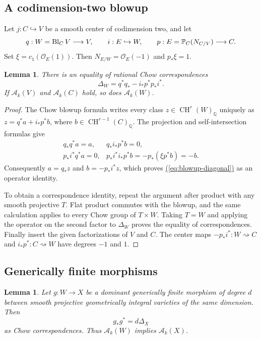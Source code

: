 \documentclass[11pt,a4paper]{article}
\newtheorem{lemma}[theorem]{Lemma}
\theoremstyle{definition}
\theoremstyle{remark}\newtheorem{remark}[theorem]{Remark}
\numberwithin{equation}{section}
\newcommand{\Q}{\mathbb Q}\newcommand{\R}{\mathbb R}\newcommand{\C}{\mathbb C}
\newcommand{\PP}{\mathbb P}\newcommand{\LL}{\mathbb L}
\newcommand{\CH}{\operatorname{CH}}\newcommand{\an}{\mathrm{an}}
\renewcommand{\eqref}[1]{\hyperref[#1]{\textcolor{equationlink}{(\ref*{#1})}}}
\begin{document}
\subsection{A codimension-two blowup}

Let $j:C\hookrightarrow V$ be a smooth center of codimension two,
and let
\[
 q:W=\Bl_CV\longrightarrow V,\qquad i:E\hookrightarrow W,
 \qquad p:E=\PP_C(N_{C/V})\longrightarrow C.
\]
Set $\xi=c_1(\mathcal O_E(1))$. Then $N_{E/W}=\mathcal O_E(-1)$
and $p_*\xi=1$.

\begin{lemma}\label{lem:blowup}
There is an equality of rational Chow correspondences
\begin{equation}\label{eq:blowup-diagonal}
        \Delta_W=q^*q_*-i_*p^*p_*i^*.
\end{equation}
If $\mathcal A_k(V)$ and $\mathcal A_k(C)$ hold, so does
$\mathcal A_k(W)$.
\end{lemma}

\begin{proof}
The Chow blowup formula \cite[\S6.7]{Fulton} writes every class
$z\in\CH^r(W)_\Q$ uniquely as
$z=q^*a+i_*p^*b$, where $b\in\CH^{r-1}(C)_\Q$. The projection
and self-intersection formulas give
\[
\begin{array}{ll}
 q_*q^*a=a,&q_*i_*p^*b=0,\\
 p_*i^*q^*a=0,&p_*i^*i_*p^*b=-p_*(\xi p^*b)=-b.
\end{array}
\]
Consequently $a=q_*z$ and $b=-p_*i^*z$, which proves
\eqref{eq:blowup-diagonal} as an operator identity.

To obtain a correspondence identity, repeat the argument after
product with any smooth projective $T$. Flat product commutes with
the blowup, and the same calculation applies to every Chow group
of $T\times W$. Taking $T=W$ and applying the operator on the
second factor to $\Delta_W$ proves the equality of correspondences.
Finally insert the given factorizations of $V$ and $C$. The center
maps $-p_*i^*:W\rightsquigarrow C$ and
$i_*p^*:C\rightsquigarrow W$ have degrees $-1$ and $1$.
\end{proof}

\subsection{Generically finite morphisms}

\begin{lemma}\label{lem:degree}
Let $g:W\to X$ be a dominant generically finite morphism of degree
$d$ between smooth projective geometrically integral varieties of
the same dimension. Then
\begin{equation}\label{eq:degree-diagonal}
                       g_*g^*=d\Delta_X
\end{equation}
as Chow correspondences. Thus $\mathcal A_k(W)$ implies
$\mathcal A_k(X)$.
\end{lemma}
\end{document}
